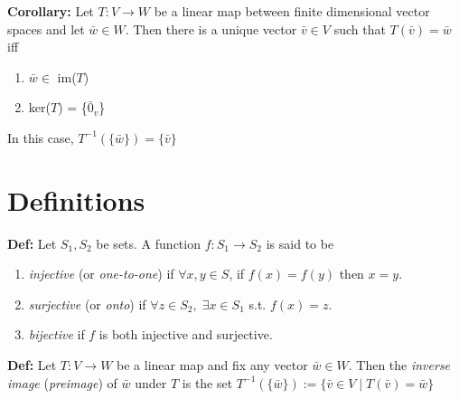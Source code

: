 \noindent 
\textbf{Corollary:} Let $T: V \rightarrow W$ be a linear map between finite dimensional vector spaces and let $\bar w \in W$. Then there is a unique vector $\bar v \in V$ such that $T(\bar v) = \bar w$ iff 
\begin{enumerate}
    \item $\bar w \in $ im($T$)
    \item ker($T$) = \{$\bar 0_v$\} 
\end{enumerate}
In this case, $T^{-1}(\{\bar w\}) = \{\bar v\}$


\section*{Definitions}
\textbf{Def:} Let $S_1, S_2$ be sets. A function $f: S_1 \rightarrow S_2$ is said to be 
\begin{enumerate}
    \item \textit{injective} (or \textit{one-to-one}) if $\forall x,y \in S$, if $f(x) = f(y)$ then $x = y$.
    \item \textit{surjective} (or \textit{onto}) if $\forall z \in S_2, \; \exists x \in S_1$ s.t. $f(x) = z$. 
    \item \textit{bijective} if $f$ is both injective and surjective. 
\end{enumerate}

\noindent 
\textbf{Def:} Let $T: V \rightarrow W$ be a linear map and fix any vector $\bar w \in W$. Then the \textit{inverse image} (\textit{preimage}) of $\bar w$ under $T$ is the set $T^{-1}(\{\bar w\}) := \{\bar v \in V \mid T(\bar v) = \bar w\}$ 